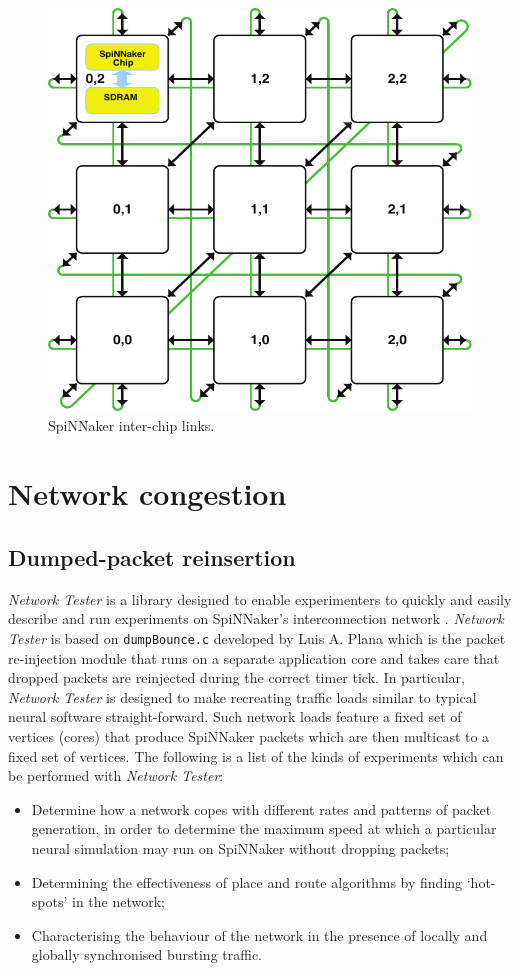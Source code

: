\documentclass[a4paper, 11pt]{article}
\newlength\drop
\begin{document}
\begin{figure}[b]
	\centering
	\includegraphics[width=0.35\linewidth]{images/system_architecture.pdf}
	\caption{SpiNNaker inter-chip links.}
	\label{fig:interchip_links}	
\end{figure}

\clearpage
\section{Network congestion}
\label{sec:congestion}

\subsection{Dumped-packet reinsertion}

 
\emph{Network Tester} is a library designed to enable experimenters to quickly and easily describe and run experiments on SpiNNaker's interconnection network \citep{heathcote2015networktester}. \emph{Network Tester} is based on \verb|dumpBounce.c| developed by Luis A. Plana which is the packet re-injection module that runs on a separate application core and takes care that dropped packets are reinjected during the correct timer tick. In particular, \emph{Network Tester} is designed to make recreating traffic loads similar to typical neural software straight-forward. Such network loads feature a fixed set of vertices (cores) that produce SpiNNaker packets which are then multicast to a fixed set of vertices. The following is a list of the kinds of experiments which can be performed with \emph{Network Tester}:
\begin{itemize}
\item Determine how a network copes with different rates and patterns of packet generation, in order to determine the maximum speed at which a particular neural simulation may run on SpiNNaker without dropping packets;
\item Determining the effectiveness of place and route algorithms by finding `hot-spots' in the network;
\item Characterising the behaviour of the network in the presence of locally and globally synchronised bursting traffic.
\end{itemize}
\end{document}

